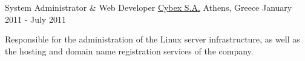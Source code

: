 \begin{cventries}
\vspace{0.1in}

  \cventry
        {System Administrator \& Web Developer}
        {\href{http://www.cybex.gr/}{Cybex S.A.}}
    {Athens, Greece}
    {January 2011 - July 2011}
		{
      \begin{cvitems}
      \item[] {Responsible for the administration of the Linux server infrastructure,
          as well as the hosting and domain name registration services of the
          company.}
      \end{cvitems}
        }

\end{cventries}
